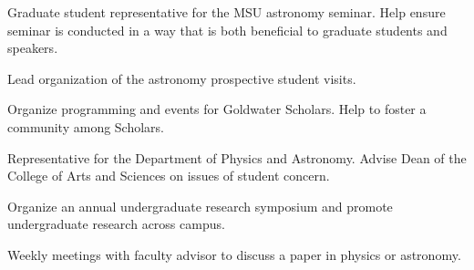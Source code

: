 \documentclass[letterpaper]{deedy-resume} %
\begin{document}
Graduate student representative for the MSU astronomy seminar. Help ensure seminar is conducted in a way that is both beneficial to graduate students and speakers.
\sectionspace %



Lead organization of the astronomy prospective student visits.
\sectionspace %



Organize programming and events for Goldwater Scholars. Help to foster a
community among Scholars.
\sectionspace %



Representative for the Department of Physics and Astronomy. Advise Dean of the College of Arts and Sciences
on issues of student concern.
\sectionspace %



Organize an annual undergraduate research symposium and promote undergraduate research across campus.
\sectionspace %



Weekly meetings with faculty advisor to discuss a paper in physics or astronomy.
\sectionspace %

\protected{}
\end{document}
